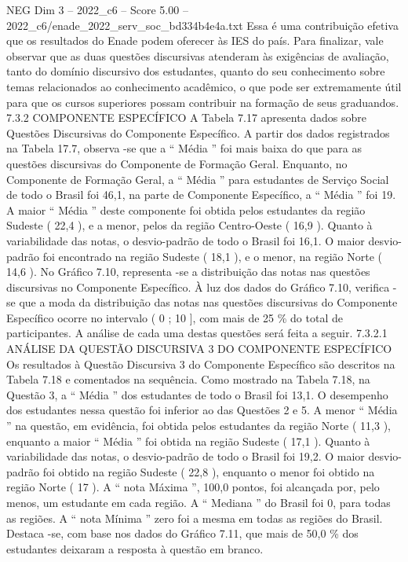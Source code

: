 \begin{textsample}{NEG Dim 3 – 2022\_c6 – Score 5.00 – 2022\_c6/enade\_2022\_serv\_soc\_bd334b4e4a.txt}
Essa é uma contribuição efetiva que os resultados do Enade podem oferecer às IES do país.
Para finalizar, vale observar que as duas questões discursivas atenderam às exigências de avaliação, tanto do domínio discursivo dos estudantes, quanto do seu conhecimento sobre temas relacionados ao conhecimento acadêmico, o que pode ser extremamente útil para que os cursos superiores possam contribuir na formação de seus graduandos. 7.3.2 COMPONENTE ESPECÍFICO A Tabela 7.17 apresenta dados sobre Questões Discursivas do Componente Específico.
A partir dos dados registrados na Tabela 17.7, observa -se que a “ Média ” foi mais baixa do que para as questões discursivas do Componente de Formação Geral.
Enquanto, no Componente de Formação Geral, a “ Média ” para estudantes de Serviço Social de todo o Brasil foi 46,1, na parte de Componente Específico, a “ Média ” foi 19.
A maior “ Média ” deste componente foi obtida pelos estudantes da região Sudeste ( 22,4 ), e a menor, pelos da região Centro-Oeste ( 16,9 ).
Quanto à variabilidade das notas, o desvio-padrão de todo o Brasil foi 16,1.
O maior desvio-padrão foi encontrado na região Sudeste ( 18,1 ), e o menor, na região Norte ( 14,6 ).
No Gráfico 7.10, representa -se a distribuição das notas nas questões discursivas no Componente Específico.
À luz dos dados do Gráfico 7.10, verifica -se que a moda da distribuição das notas nas questões discursivas do Componente Específico ocorre no intervalo ( 0 ; 10 ], com mais de 25 \% do total de participantes.
A análise de cada uma destas questões será feita a seguir. 7.3.2.1 ANÁLISE DA QUESTÃO DISCURSIVA 3 DO COMPONENTE ESPECÍFICO Os resultados à Questão Discursiva 3 do Componente Específico são descritos na Tabela 7.18 e comentados na sequência.
Como mostrado na Tabela 7.18, na Questão 3, a “ Média ” dos estudantes de todo o Brasil foi 13,1.
O desempenho dos estudantes nessa questão foi inferior ao das Questões 2 e 5.
A menor “ Média ” na questão, em evidência, foi obtida pelos estudantes da região Norte ( 11,3 ), enquanto a maior “ Média ” foi obtida na região Sudeste ( 17,1 ).
Quanto à variabilidade das notas, o desvio-padrão de todo o Brasil foi 19,2.
O maior desvio-padrão foi obtido na região Sudeste ( 22,8 ), enquanto o menor foi obtido na região Norte ( 17 ).
A “ nota Máxima ”, 100,0 pontos, foi alcançada por, pelo menos, um estudante em cada região.
A “ Mediana ” do Brasil foi 0, para todas as regiões.
A “ nota Mínima ” zero foi a mesma em todas as regiões do Brasil.
Destaca -se, com base nos dados do Gráfico 7.11, que mais de 50,0 \% dos estudantes deixaram a resposta à questão em branco.

\end{textsample}
